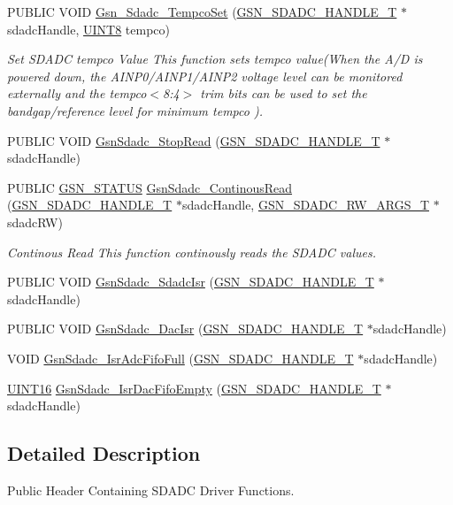 \begin{DoxyCompactItemize}
PUBLIC VOID \hyperlink{a00652_ga961a674691b0d10c346638e4f38bf72d}{Gsn\_\-Sdadc\_\-TempcoSet} (\hyperlink{a00214}{GSN\_\-SDADC\_\-HANDLE\_\-T} $\ast$sdadcHandle, \hyperlink{a00660_gab27e9918b538ce9d8ca692479b375b6a}{UINT8} tempco)
\begin{DoxyCompactList}\small\item\em Set SDADC tempco Value This function sets tempco value(When the A/D is powered down, the AINP0/AINP1/AINP2 voltage level can be monitored externally and the tempco$<$8:4$>$ trim bits can be used to set the bandgap/reference level for minimum tempco ). \end{DoxyCompactList}\item 
PUBLIC VOID \hyperlink{a00652_ga3fef35337d14db3014789953e98ee2fa}{GsnSdadc\_\-StopRead} (\hyperlink{a00214}{GSN\_\-SDADC\_\-HANDLE\_\-T} $\ast$sdadcHandle)
\item 
PUBLIC \hyperlink{a00660_gada5951904ac6110b1fa95e51a9ddc217}{GSN\_\-STATUS} \hyperlink{a00652_ga8cdb1e407d22f1c971ab1fdfc6c9ea90}{GsnSdadc\_\-ContinousRead} (\hyperlink{a00214}{GSN\_\-SDADC\_\-HANDLE\_\-T} $\ast$sdadcHandle, \hyperlink{a00215}{GSN\_\-SDADC\_\-RW\_\-ARGS\_\-T} $\ast$sdadcRW)
\begin{DoxyCompactList}\small\item\em Continous Read This function continously reads the SDADC values. \end{DoxyCompactList}\item 
PUBLIC VOID \hyperlink{a00583_a53f57c42fe9f84c1fbd7fb8870c6c5ee}{GsnSdadc\_\-SdadcIsr} (\hyperlink{a00214}{GSN\_\-SDADC\_\-HANDLE\_\-T} $\ast$sdadcHandle)
\item 
PUBLIC VOID \hyperlink{a00583_a5c1d2dbfab796454af7af30ed430edca}{GsnSdadc\_\-DacIsr} (\hyperlink{a00214}{GSN\_\-SDADC\_\-HANDLE\_\-T} $\ast$sdadcHandle)
\item 
VOID \hyperlink{a00583_a0fb0dd53cd078794d4dcc1215fd386c1}{GsnSdadc\_\-IsrAdcFifoFull} (\hyperlink{a00214}{GSN\_\-SDADC\_\-HANDLE\_\-T} $\ast$sdadcHandle)
\item 
\hyperlink{a00660_ga09f1a1fb2293e33483cc8d44aefb1eb1}{UINT16} \hyperlink{a00583_a04232fa8c827c5a201c1d1c5ea9307f5}{GsnSdadc\_\-IsrDacFifoEmpty} (\hyperlink{a00214}{GSN\_\-SDADC\_\-HANDLE\_\-T} $\ast$sdadcHandle)
\end{DoxyCompactItemize}


\subsection{Detailed Description}
Public Header Containing SDADC Driver Functions. 

